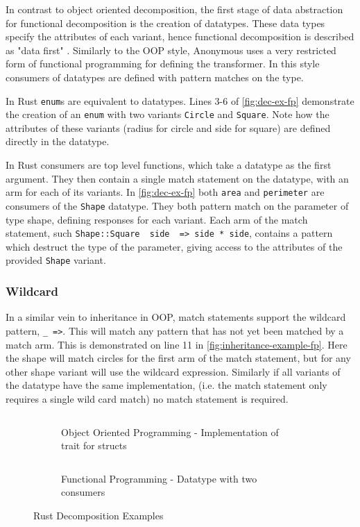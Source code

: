 \documentclass[ oneside,%
                    author={James Elgar},
                    degree={MEng},
                     title={Bidirectional transformer between functional and \\ object-oriented programming in Rust},
                  subtitle={}]{dissertation}
\newcommand{\weixin}{Anonymous }
\newcommand{\rust}[1]{\texttt{#1}}
\newcommand{\codefile}[2]{\inputminted[xleftmargin=20pt,linenos, breaklines]{#1}{#2}}
\newcommand{\rustfile}[1]{\codefile{rust}{../#1.rs}}
\newcommand{\rustexample}[1]{\rustfile{examples/src/#1}}
\begin{document}
In contrast to object oriented decomposition, the first stage of data abstraction for functional decomposition is the creation of datatypes.
These data types specify the attributes of each variant, hence functional decomposition is described as "data first" \cite{food}. 
Similarly to the OOP style, \weixin uses a very restricted form of functional programming for defining the transformer.  
In this style consumers of datatypes are defined with pattern matches on the type.

In Rust \rust{enum}s are equivalent to datatypes. Lines 3-6 of \autoref{fig:dec-ex-fp} demonstrate the creation of an \rust{enum} with two variants \rust{Circle} and \rust{Square}. Note how the attributes of these variants (radius for circle and side for square) are defined directly in the datatype.

In Rust consumers are top level functions, which take a datatype as the first argument. They then contain a single match statement on the datatype, with an arm for each of its variants. In \autoref{fig:dec-ex-fp} both \rust{area} and \rust{perimeter} are consumers of the \rust{Shape} datatype. 
They both pattern match on the parameter of type shape, defining responses for each variant. Each arm of the match statement, such \rust{Shape::Square { side } => side * side}, contains a pattern which destruct the type of the parameter, giving access to the attributes of the provided \rust{Shape} variant.

\subsubsection{Wildcard}

In a similar vein to inheritance in OOP, match statements support the wildcard pattern, \rust{_ =>}. This will match any pattern that has not yet been matched by a match arm. This is demonstrated on line 11 in \autoref{fig:inheritance-example-fp}. Here the shape will match circles for the first arm of the match statement, but for any other shape variant will use the wildcard expression.
Similarly if all variants of the datatype have the same implementation, (i.e. the match statement only requires a single wild card match) no match statement is required. 

\begin{figure}
\centering
\begin{subfigure}{.5\textwidth}
    \rustexample{shape/oop}
    \caption{Object Oriented Programming - Implementation of trait for structs}
    \label{fig:dec-ex-oop}
\end{subfigure}%
\begin{subfigure}{.5\textwidth}
    \rustexample{shape/fp}
    \caption{Functional Programming - Datatype with two consumers}
    \label{fig:dec-ex-fp}
\end{subfigure}
\caption{Rust Decomposition Examples}
\label{fig:dec-ex}
\end{figure}
\end{document}
